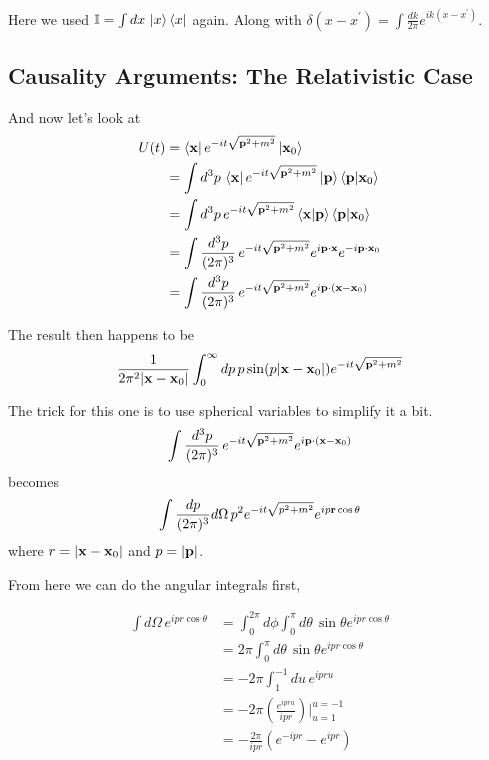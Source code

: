 Here we used $\mathbb{I} = \int dx \, \ket{x}\bra{x}$ again.
Along with $\delta(x-x^\prime) = \int \frac{dk}{2\pi} e^{ik(x-x^\prime)}$.







\subsection{Causality Arguments: The Relativistic Case}

And now let's look at
\begin{align*}
U(t) &= \bra{\boldsymbol{\mathbf{x}}} e^{-it\sqrt{\boldsymbol{\mathbf{p}}^2 + m^2}} \ket{\boldsymbol{\mathbf{x}}_0} \\
&= \int d^3p \, \bra{\boldsymbol{\mathbf{x}}} e^{-it\sqrt{\boldsymbol{\mathbf{p}}^2 + m^2}} \ket{\boldsymbol{\mathbf{p}}} \braket{\boldsymbol{\mathbf{p}} | \boldsymbol{\mathbf{x}}_0} \\
&= \int d^3p \, e^{-it\sqrt{\boldsymbol{\mathbf{p}}^2 + m^2}} \braket{\boldsymbol{\mathbf{x}} | \boldsymbol{\mathbf{p}}} \braket{\boldsymbol{\mathbf{p}} | \boldsymbol{\mathbf{x}}_0} \\
&= \int \frac{d^3p}{(2\pi)^3} \, e^{-it\sqrt{\boldsymbol{\mathbf{p}}^2 + m^2}} e^{i\boldsymbol{\mathbf{p}}\cdot\boldsymbol{\mathbf{x}}} e^{-i\boldsymbol{\mathbf{p}}\cdot\boldsymbol{\mathbf{x}}_0} \\
&= \int \frac{d^3p}{(2\pi)^3} \, e^{-it\sqrt{\boldsymbol{\mathbf{p}}^2 + m^2}} e^{i\boldsymbol{\mathbf{p}}\cdot(\boldsymbol{\mathbf{x}} - \boldsymbol{\mathbf{x}}_0)} \\
\end{align*}

The result then happens to be
$$
\frac{1}{2\pi^2 |\boldsymbol{\mathbf{x}}-\boldsymbol{\mathbf{x}}_0|}
    \int_{0}^{\infty} dp \, p \sin(p|\boldsymbol{\mathbf{x}}-\boldsymbol{\mathbf{x}}_0|) e^{-it\sqrt{\boldsymbol{\mathbf{p}}^2 + m^2}}
$$

The trick for this one is to use spherical variables to simplify it a bit.
$$
\int \frac{d^3p}{(2\pi)^3} \, e^{-it\sqrt{\boldsymbol{\mathbf{p}}^2 + m^2}} e^{i\boldsymbol{\mathbf{p}}\cdot(\boldsymbol{\mathbf{x}} - \boldsymbol{\mathbf{x}}_0)} 
$$
becomes
$$
\int \frac{dp}{(2\pi)^3} d\Omega \, p^2 e^{-it\sqrt{p^2 + m^2}} e^{ip\boldsymbol{\mathbf{r}}\cos\theta} 
$$
where $r = |\boldsymbol{\mathbf{x}} - \boldsymbol{\mathbf{x}}_0|$ and $p = |\boldsymbol{\mathbf{p}}|$.

From here we can do the angular integrals first,

\begin{align*}
\int d\Omega \, e^{ipr\cos\theta} &= 
    \int_{0}^{2\pi} d\phi \int_{0}^{\pi} d\theta \, \sin\theta e^{ipr\cos\theta} \\
&= 2\pi \int_{0}^{\pi} d\theta \, \sin\theta e^{ipr\cos\theta} \\
&= -2\pi \int_{1}^{-1} du \, e^{ipr u} \\
&= -2\pi \left( \frac{ e^{ipr u} }{ ipr } \right) \Big|_{u=1}^{u=-1} \\
&= -\frac{2\pi}{ipr} \left( e^{-ipr} - e^{ipr} \right)
\end{align*}

